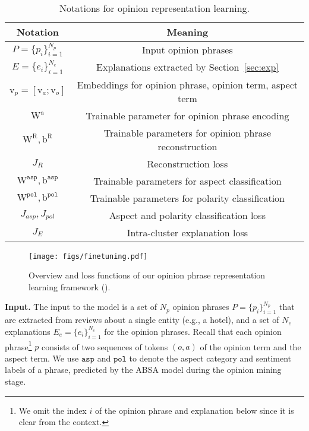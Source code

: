 \setlength{\tabcolsep}{2pt}
\begin{table}[!t]
    \small
    \centering
    \begin{tabular}{cc}
    \toprule
        \textbf{Notation} & \textbf{Meaning} \\ \midrule
        $P=\{p_i\}_{i=1}^{N_p}$ & Input opinion phrases \\
        $E=\{e_i\}_{i=1}^{N_e}$ & Explanations extracted by Section~\ref{sec:exp} \\
        $\mathrm{v}_{p} = [\mathrm{v}_a; \mathrm{v}_o]$ & Embeddings for opinion phrase, opinion term, aspect term\\
        $\mathrm{W}^{\mathrm{a}}$ & Trainable parameter for opinion phrase encoding\\
        $\mathrm{W}^{\mathrm{R}}, \mathrm{b}^{\mathrm{R}}$ & Trainable parameters for opinion phrase reconstruction\\
        $J_R $ & Reconstruction loss \\
       $\mathrm{W}^\mathtt{asp}, \mathrm{b}^\mathtt{asp} $ & Trainable parameters for aspect classification \\
       $\mathrm{W}^\mathtt{pol}, \mathrm{b}^\mathtt{pol}$ & Trainable parameters for polarity classification\\
        $J_{asp}, J_{pol}$ & Aspect and polarity classification loss\\ 
        $J_E$ & Intra-cluster explanation loss \\
        \bottomrule
    \end{tabular}
    \caption{Notations for opinion representation learning.}
    \label{tab:symbol2}
    \vspace{-4mm}
\end{table}

\begin{figure*}[t]
\begin{minipage}{0.99\textwidth}
\centering
\noindent
\texttt{[image: figs/finetuning.pdf]}
\caption{Overview and loss functions of our opinion phrase representation learning framework (\canonical).}
\label{fig:clustermodel}
\end{minipage}
\vspace{-3mm}
\end{figure*}


\smallskip
\noindent \textbf{Input.} The input to the model is a set of $N_p$ opinion phrases $P = \{p_i\}_{i=1}^{N_p}$ 
that are extracted from reviews about a single entity (e.g., a hotel), and a set of $N_e$ explanations $E_e = \{e_i\}_{i=1}^{N_e}$ for the opinion phrases.
Recall that each opinion phrase\footnote{We omit the index $i$ of the opinion phrase and explanation below since it is clear from the context.} $p$ consists of two sequences of tokens $(o, a)$ of the opinion term and the aspect term.
We use $\mathtt{asp}$ and $\mathtt{pol}$ to denote the aspect category and sentiment labels of a phrase, predicted by  %
the ABSA model during the opinion mining stage. 


